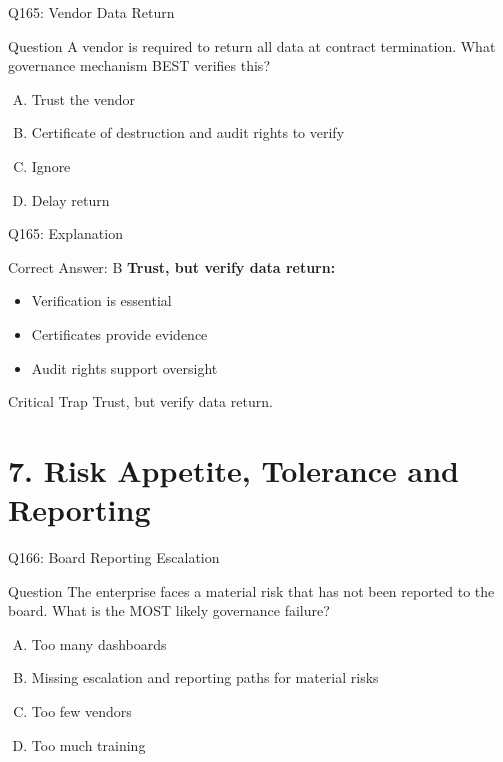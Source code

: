 \documentclass{beamer}
\begin{document}
	\begin{frame}{Q165: Vendor Data Return}
		\begin{block}{Question}
			A vendor is required to return all data at contract termination. What governance mechanism BEST verifies this?
		\end{block}
		\begin{enumerate}[(A)]
			\item Trust the vendor
			\item Certificate of destruction and audit rights to verify
			\item Ignore
			\item Delay return
		\end{enumerate}
	\end{frame}
	
	\begin{frame}{Q165: Explanation}
		\begin{block}{Correct Answer: B}
			\textbf{Trust, but verify data return:}
			\begin{itemize}
				\item Verification is essential
				\item Certificates provide evidence
				\item Audit rights support oversight
			\end{itemize}
		\end{block}
		\begin{alertblock}{Critical Trap}
			Trust, but verify data return.
		\end{alertblock}
	\end{frame}
	
	\section{7. Risk Appetite, Tolerance and Reporting}
	
	\begin{frame}{Q166: Board Reporting Escalation}
		\begin{block}{Question}
			The enterprise faces a material risk that has not been reported to the board. What is the MOST likely governance failure?
		\end{block}
		\begin{enumerate}[(A)]
			\item Too many dashboards
			\item Missing escalation and reporting paths for material risks
			\item Too few vendors
			\item Too much training
		\end{enumerate}
	\end{frame}
	
\end{document}
